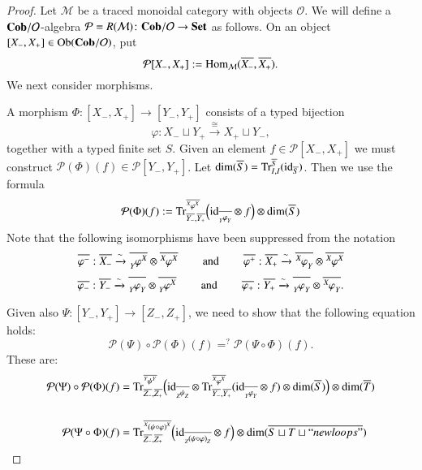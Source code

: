 \documentclass{amsart}
\def\tn{\textnormal}
\def\mc{\mathcal}
\def\Hom{\tn{Hom}}
\def\Ob{\tn{Ob}}
\def\dim{\tn{dim}}
\def\Trace{\tn{Tr}}
\def\hsp{\hspace{.3in}}
\def\to{\rightarrow}
\def\taking{\colon}
\def\too{\longrightarrow}
\def\iso{\cong}
\def\ol{\overline}
\newcommand{\To}[1]{\xrightarrow{#1}}
\def\id{\tn{id}}
\def\Cob{{\bf Cob}}
\def\Set{{\bf Set}}
\def\mcM{\mc{M}}
\def\mcO{\mc{O}}
\def\mcP{\mc{P}}
\newcommand{\inp}[1]{{#1_-}}
\newcommand{\outp}[1]{{#1_+}}
\newcommand{\feeddd}[3]{{\tensor*[^{#2}_{\color{white}{!}}]{{#1}}{^{#3}}}}%
\newcommand{\feeddc}[3]{{\tensor*[^{#2}]{{#1}}{_{#3}}}}
\newcommand{\feedcd}[3]{{\tensor*[_{#2}]{{#1}}{^{#3}}}}
\newcommand{\feedcc}[3]{{\tensor*[^{\color{white}{!}}_{#2}]{{#1}}{_{#3}}}}
\newcommand{\vLst}[1]{\ol{#1}}
\newcommand{\vinp}[1]{\vLst{\inp{#1}}}
\newcommand{\voutp}[1]{\vLst{\outp{#1}}}
\theoremstyle{remark}
\theoremstyle{definition}
\begin{document}
\begin{proof}

Let $\mcM$ be a traced monoidal category with objects $\mcO$. We will define a $\Cob/\mcO$-algebra $\mcP=R(\mcM)\taking\Cob/\mcO\to\Set$ as follows. On an object $[\inp{X},\outp{X}]\in\Ob(\Cob/\mcO)$, put 
$$\mcP[\inp{X},\outp{X}]:=\Hom_{\mcM}(\vinp{X},\voutp{X}).$$
We next consider morphisms.


A morphism $\Phi\taking[\inp{X},\outp{X}]\too[\inp{Y},\outp{Y}]$ consists of a typed bijection 
$$\varphi\taking\inp{X}\sqcup \outp{Y}\To{\iso}\outp{X}\sqcup \inp{Y},$$ 
together with a typed finite set $S$. Given an element $f\in\mcP[\inp{X},\outp{X}]$ we must construct $\mcP(\Phi)(f)\in\mcP[\inp{Y},\outp{Y}]$. Let $\dim(\ol{S})=\Trace^{\ol{S}}_{I,I}(\id_{\ol{S}})$. Then we use the formula
$$\mcP(\Phi)(f):=
\Trace^{\ol{\feeddd{\varphi}{X}{X}}}_{\ol{Y_-},\ol{Y_+}}\Big(
\id_{\ol{\feedcc{\varphi}{Y}{Y}}}\otimes f
\Big)
\otimes\dim(\ol{S})
$$
Note that the following isomorphisms have been suppressed from the notation
$$
\ol{\varphi^-}:\ol{\inp{X}}\To{\sim}\ol{\feedcd{\varphi}{Y}{X}}\otimes\ol{\feeddd{\varphi}{X}{X}}
\hsp\tn{and}\hsp
\ol{\varphi^+}:\ol{\outp{X}}\To{\sim}\ol{\feeddc{\varphi}{X}{Y}}\otimes\ol{\feeddd{\varphi}{X}{X}}
$$
$$
\ol{\varphi_-}:\ol{\inp{Y}}\To{\sim}\ol{\feedcc{\varphi}{Y}{Y}}\otimes\ol{\feedcd{\varphi}{Y}{X}}
\hsp\tn{and}\hsp
\ol{\varphi_+}:\ol{\outp{Y}}\To{\sim}\ol{\feedcc{\varphi}{Y}{Y}}\otimes\ol{\feeddc{\varphi}{X}{Y}}.
$$

Given also $\Psi\taking[\inp{Y},\outp{Y}]\too[\inp{Z},\outp{Z}]$, we need to show that the following equation holds: 
$$\mcP(\Psi)\circ\mcP(\Phi)(f)=^?\mcP(\Psi\circ\Phi)(f).$$
These are:
\begin{align}
\label{eq:composition 1}
\mcP(\Psi)\circ\mcP(\Phi)(f)&=
\Trace^{\ol{\feeddd{\psi}{Y}{Y}}}_{\ol{Z_-},\ol{Z_+}}
\Big(
\id_{\ol{\feedcc{\psi}{Z}{Z}}}\otimes
\Trace^{\ol{\feeddd{\varphi}{X}{X}}}_{\ol{Y_-},\ol{Y_+}}(\id_{\ol{\feedcc{\varphi}{Y}{Y}}}\otimes f)\otimes\dim(\ol{S})
\Big)
\otimes\dim(\ol{T})
\\\nonumber\\
\label{eq:composition 2}
\mcP(\Psi\circ\Phi)(f)&=
\Trace^{\ol{\feeddd{(\psi\circ\varphi)}{X}{X}}}_{\ol{Z_-},\ol{Z_+}}\Big(\id_{\ol{\feedcc{(\psi\circ\varphi)}{Z}{Z}}}\otimes f\Big)\otimes\dim(\ol{S\sqcup T\sqcup ``newloops"})
\end{align}


\end{proof}
\end{document}
